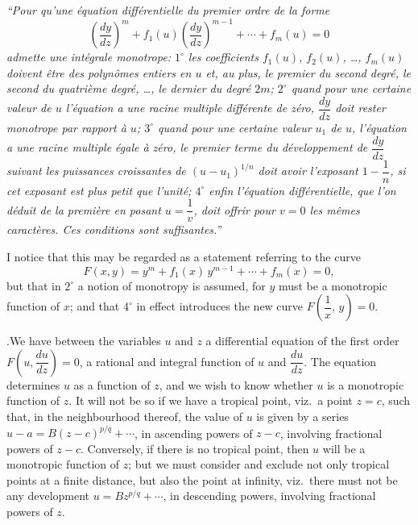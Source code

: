 \documentclass[11pt]{article}
\begin{document}
\medskip

\noindent\textit{``Pour qu'une \'equation diff\'erentielle du premier ordre de la forme
\[
\left(\frac{dy}{dz}\right)^{m} + f_{1}(u)\!\left(\frac{dy}{dz}\right)^{m-1} + \cdots + f_{m}(u) = 0
\]
admette une int\'egrale monotrope: $1^{\circ}$ les coefficients $f_{1}(u)$, $f_{2}(u)$, \ldots, $f_{m}(u)$ doivent \^etre des polyn\^omes entiers en $u$ et, au plus, le premier du second degr\'e, le second du quatri\`eme degr\'e, \ldots, le dernier du degr\'e $2m$; $2^{\circ}$ quand pour une certaine valeur de $u$ l'\'equation a une racine multiple diff\'erente de z\'ero, $\dfrac{dy}{dz}$ doit rester monotrope par rapport \`a $u$; $3^{\circ}$ quand pour une certaine valeur $u_{1}$ de $u$, l'\'equation a une racine multiple \'egale \`a z\'ero, le premier terme du d\'eveloppement de $\dfrac{dy}{dz}$ suivant les puissances croissantes de $(u-u_{1})^{1/n}$ doit avoir l'exposant $1-\dfrac{1}{n}$, si cet exposant est plus petit que l'unit\'e; $4^{\circ}$ enfin l'\'equation diff\'erentielle, que l'on d\'eduit de la premi\`ere en posant $u=\dfrac{1}{v}$, doit offrir pour $v=0$ les m\^emes caract\`eres. Ces conditions sont suffisantes.''}

\medskip

I notice that this may be regarded as a statement referring to the curve
\[
F(x,y) = y^{m} + f_{1}(x)\,y^{m-1} + \cdots + f_{m}(x) = 0,
\]
but that in $2^{\circ}$ a notion of monotropy is assumed, for $y$ must be a monotropic function of $x$; and that $4^{\circ}$ in effect introduces the new curve $F\!\left(\dfrac{1}{x},\,y\right)=0$.

\medskip

.\quad We have between the variables $u$ and $z$ a differential equation of the first order $F\!\left(u,\dfrac{du}{dz}\right)=0$, a rational and integral function of $u$ and $\dfrac{du}{dz}$. The equation determines $u$ as a function of $z$, and we wish to know whether $u$ is a monotropic function of $z$. It will not be so if we have a tropical point, viz.\ a point $z=c$, such that, in the neighbourhood thereof, the value of $u$ is given by a series $u-a = B(z-c)^{p/q} + \cdots$, in ascending powers of $z-c$, involving fractional powers of $z-c$. Conversely, if there is no tropical point, then $u$ will be a monotropic function of $z$; but we must consider and exclude not only tropical points at a finite distance, but also the point at infinity, viz.\ there must not be any development $u = Bz^{p/q} + \cdots$, in descending powers, involving fractional powers of $z$.
\end{document}
